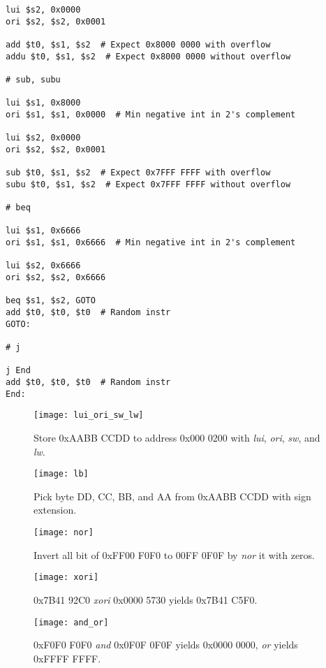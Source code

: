 \begin{verbatim}
lui $s2, 0x0000
ori $s2, $s2, 0x0001

add $t0, $s1, $s2  # Expect 0x8000 0000 with overflow
addu $t0, $s1, $s2  # Expect 0x8000 0000 without overflow

# sub, subu

lui $s1, 0x8000
ori $s1, $s1, 0x0000  # Min negative int in 2's complement

lui $s2, 0x0000
ori $s2, $s2, 0x0001

sub $t0, $s1, $s2  # Expect 0x7FFF FFFF with overflow
subu $t0, $s1, $s2  # Expect 0x7FFF FFFF without overflow

# beq

lui $s1, 0x6666
ori $s1, $s1, 0x6666  # Min negative int in 2's complement

lui $s2, 0x6666
ori $s2, $s2, 0x6666

beq $s1, $s2, GOTO
add $t0, $t0, $t0  # Random instr
GOTO:

# j

j End
add $t0, $t0, $t0  # Random instr
End:
\end{verbatim}

\begin{figure}[htbp]
   \centering
   \texttt{[image: lui\_ori\_sw\_lw]}
   \caption{Store 0xAABB CCDD to address 0x000 0200 with \textit{lui}, \textit{ori}, \textit{sw}, and \textit{lw}.}
\end{figure}

\begin{figure}[htbp]
   \centering
   \texttt{[image: lb]}
   \caption{Pick byte DD, CC, BB, and AA from 0xAABB CCDD with sign extension.}
\end{figure}

\begin{figure}[htbp]
   \centering
   \texttt{[image: nor]}
   \caption{Invert all bit of 0xFF00 F0F0 to 00FF 0F0F by \textit{nor} it with zeros.}
\end{figure}

\begin{figure}[htbp]
   \centering
   \texttt{[image: xori]}
   \caption{0x7B41 92C0 \textit{xori} 0x0000 5730 yields 0x7B41 C5F0.}
\end{figure}

\begin{figure}[htbp]
   \centering
   \texttt{[image: and\_or]}
   \caption{0xF0F0 F0F0 \textit{and} 0x0F0F 0F0F yields 0x0000 0000, \textit{or} yields 0xFFFF FFFF.}
\end{figure}

